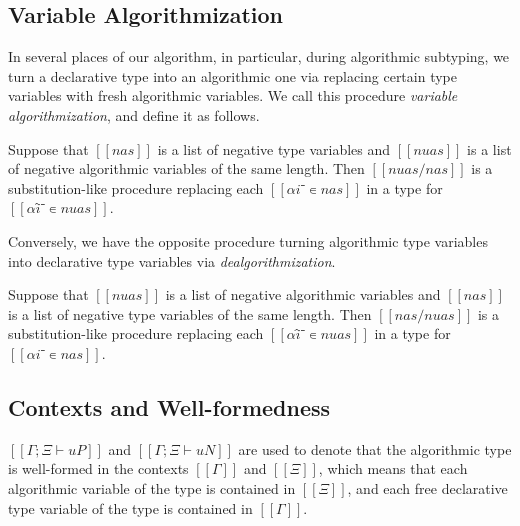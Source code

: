 \documentclass[acmsmall,natbib=false,review,anonymous]{acmart}
\begin{document}
\subsection{Variable Algorithmization}
\label{sec:variable-algorithmization}

In several places of our algorithm, in particular, during
algorithmic subtyping,
we turn a declarative type into an algorithmic one
via replacing certain type variables with fresh algorithmic variables.
We call this procedure \emph{variable algorithmization}, and define it as follows.

\begin{definition}
  Suppose that $[[nas]]$ is a list of negative type variables
  and $[[nuas]]$ is a list of negative algorithmic variables of the same length. 
  Then $[[ nuas/nas ]]$ is a substitution-like procedure replacing each $[[αi⁻ ∊ {nas}]]$
  in a type for $[[αî⁻ ∊ {nuas}]]$.
\end{definition}

Conversely, we have the opposite procedure turning algorithmic type variables
into declarative type variables via \emph{dealgorithmization}.

\begin{definition}
  Suppose that $[[nuas]]$ is a list of negative algorithmic variables
  and $[[nas]]$ is a list of negative type variables of the same length. 
  Then $[[ nas/nuas ]]$ is a substitution-like procedure replacing each
  $[[αî⁻ ∊ {nuas}]]$ in a type for $[[αi⁻ ∊ {nas}]]$.
\end{definition}


\subsection{Contexts and Well-formedness}


$[[Γ ; Ξ ⊢ uP]]$ and $[[Γ ; Ξ ⊢ uN]]$ are used to denote
that the algorithmic type is well-formed in the contexts
$[[Γ]]$ and $[[Ξ]]$, which means that each algorithmic variable
of the type is contained in $[[Ξ]]$, and each free declarative type variable
of the type is contained in $[[Γ]]$.
\end{document}
